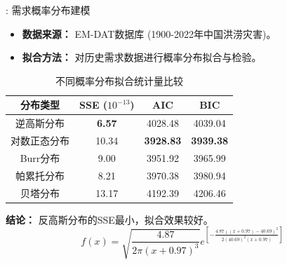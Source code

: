 \documentclass[9pt]{beamer}
\begin{document}
\begin{frame}{\insertsectionhead: 需求概率分布建模}
    \begin{itemize}
        \item \textbf{数据来源：} EM-DAT数据库 (1900-2022年中国洪涝灾害)。
        \item \textbf{拟合方法：} 对历史需求数据进行概率分布拟合与检验。
    \end{itemize}
    \begin{table}
    \centering
    \caption{不同概率分布拟合统计量比较}
        \small
\begin{tabular}{cccc}
    \toprule
    分布类型    & SSE ($10^{-13}$) & AIC        & BIC \\
    \midrule
    逆高斯分布 & \textbf{6.57}    & 4028.48    & 4039.04\\
    对数正态分布 & 10.34            & \textbf{3928.83}    & \textbf{3939.38}\\
    Burr分布      & 9.00             & 3951.92    & 3965.99   \\
    帕累托分布   & 8.21             & 3970.38    & 3980.94   \\
    贝塔分布      & 13.17            & 4192.39    & 4206.46   \\
    \bottomrule
    \end{tabular}
    \end{table}
    \textbf{结论：} 反高斯分布的SSE最小，拟合效果较好。
    \begin{equation} \label{eq:beamer_pdf_demand}
    f(x) = \sqrt{\frac{4.87}{2\pi (x + 0.97)^3}} e^{\left[ -\frac{4.87 \left((x + 0.97) - 40.69\right)^2}{2(40.69)^2 (x + 0.97)} \right]}
    \end{equation}
\end{frame}

\end{document}
